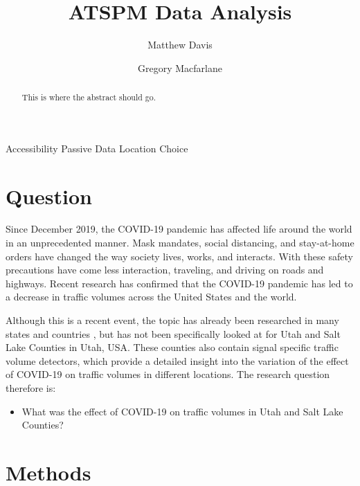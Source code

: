 \documentclass[3p, authoryear]{elsarticle} %
\providecommand{\tightlist}{%
  \setlength{\itemsep}{0pt}\setlength{\parskip}{0pt}}
\begin{document}
\begin{frontmatter}

  \title{ATSPM Data Analysis}
    \author[Brigham Young University]{Matthew Davis}
    \author[Brigham Young University]{Gregory Macfarlane}
      \address[Brigham Young University]{Civil and Environmental Engineering Department, 430 Engineering Building, Provo, Utah 84602}
  
  \begin{abstract}
  This is where the abstract should go.
  \end{abstract}
   \begin{keyword} Accessibility Passive Data Location Choice\end{keyword}
 \end{frontmatter}

\hypertarget{intro}{%
\section{Question}\label{intro}}

Since December 2019, the COVID-19 pandemic has affected life around the world in an unprecedented manner. Mask mandates, social distancing, and stay-at-home orders have changed the way society lives, works, and interacts. With these safety precautions have come less interaction, traveling, and driving on roads and highways. Recent research has confirmed that the COVID-19 pandemic has led to a decrease in traffic volumes across the United States and the world.

Although this is a recent event, the topic has already been researched in many states and countries \citep{Lee2020, Lee2021, Muley2021}, but has not been specifically looked at for Utah and Salt Lake Counties in Utah, USA. These counties also contain signal specific traffic volume detectors, which provide a detailed insight into the variation of the effect of COVID-19 on traffic volumes in different locations. The research question therefore is:

\begin{itemize}
\tightlist
\item
  What was the effect of COVID-19 on traffic volumes in Utah and Salt Lake Counties?
\end{itemize}

\hypertarget{methods}{%
\section{Methods}\label{methods}}
\end{document}
